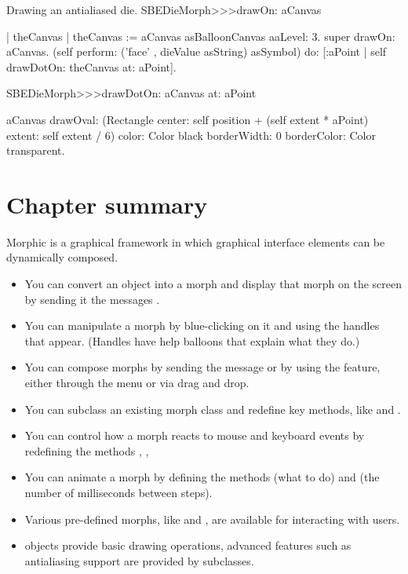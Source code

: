 \documentclass[a4paper,10pt,twoside]{book}
\begin{document}
\begin{methods}[aadie]{Drawing an antialiased die.}
SBEDieMorph>>>drawOn: aCanvas

	| theCanvas |
	theCanvas := aCanvas asBalloonCanvas aaLevel: 3.
	super drawOn: aCanvas.
	(self perform: ('face' , dieValue asString) asSymbol) do: [:aPoint |
		self drawDotOn: theCanvas at: aPoint].


SBEDieMorph>>>drawDotOn: aCanvas at: aPoint

	aCanvas
		drawOval: (Rectangle
			center: self position + (self extent * aPoint)
			extent: self extent / 6)
		color: Color black
		borderWidth: 0
		borderColor: Color transparent.
\end{methods}

\section{Chapter summary}

Morphic is a graphical framework in which graphical interface elements can be dynamically composed.

\begin{itemize}
  \item You can convert an object into a morph and display that morph on the screen by sending it the messages .
  \item You can manipulate a morph by blue-clicking on it and using the handles that appear.
  	(Handles have help balloons that explain what they do.)
  \item You can compose morphs by sending the message  or by using the  feature, either through the menu or via drag and drop.
  \item You can subclass an existing morph class and redefine key methods, like  and .
  \item You can control how a morph reacts to mouse and keyboard events by redefining the methods , , \etc
  \item You can animate a morph by defining the methods  (what to do) and  (the number of milliseconds between steps).
  \item Various pre-defined morphs, like  and , are available for interacting with users.
  \item {} objects provide basic drawing operations, advanced features such as antialiasing support are provided by  subclasses.
\end{itemize}

\ifx\wholebook\relax\else
\end{document}
